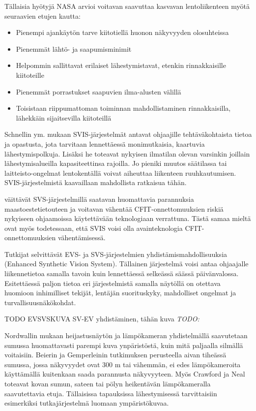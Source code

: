 \documentclass[utf8,bachelor,manualbib]{gradu3}
\begin{document}
Tällaisia hyötyjä NASA \citeyearpar{williamsym2001} arvioi voitavan saavuttaa kasvavan lentoliikenteen myötä seuraavien etujen kautta:

\begin{itemize}
\item Pienempi ajankäytön tarve kiitotiellä huonon näkyvyyden olosuhteissa
\item Pienemmät lähtö- ja saapumisminimit
\item Helpommin sallittavat erilaiset lähestymistavat, etenkin rinnakkaisille kiitoteille
\item Pienemmät porrastukset saapuvien ilma-alusten välillä
\item Toisistaan riippumattoman toiminnan mahdollistaminen rinnakkaisilla, lähekkäin sijaitsevilla kiitoteillä
\end{itemize} 

Schnellin ym. \citeyearpar{schnellym2004} mukaan SVIS-järjestelmät antavat ohjaajille tehtäväkohtaista tietoa ja opastusta, jota tarvitaan lennettäessä monimutkaisia, kaartuvia lähestymispolkuja. Lisäksi he toteavat nykyisen ilmatilan olevan varsinkin joillain lähestymisalueilla kapasiteettinsa rajoilla. Jo pieniki muutos säätilassa tai laitteisto-ongelmat lentokentällä voivat aiheuttaa liikenteen ruuhkautumisen. SVIS-järjestelmistä kaavaillaan mahdollista ratkaisua tähän.

\cite{baileyym2007} väittävät SVS-järjestelmillä saatavan huomattavia parannuksia maastoestetietouteen ja voitavan vähentää CFIT-onnettomuuksien riskiä nykyiseen ohjaamoissa käytettävään teknologiaan verrattuna. Tästä samaa mieltä ovat myös \cite{schnellym2004} todetessaan, että SVIS voisi olla avainteknologia CFIT-onnettomuuksien vähentämisessä.

Tutkijat selvittävät EVS- ja SVS-järjestelmien yhdistämismahdollisuuksia (Enhanced Synthetic Vision System). Tällainen järjestelmä voisi antaa ohjaajalle liikennetietoa samalla tavoin kuin lennettäessä selkeässä säässä päivänvalossa. Esitettäessä paljon tietoa eri järjestelmistä samalla näytöllä on otettava huomioon inhimilliset tekijät, lentäjän suorituskyky, mahdolliset ongelmat ja turvallisuusnäkökohdat. \citep{crawfordneal2006}

TODO EVSVSKUVA SV-EV yhdistäminen, tähän kuva \citep{mollersachs1994} \emph{TODO:}

Nordwallin \citeyearpar{nordwall1993} mukaan heijastusnäytön ja lämpökameran yhdistelmällä saavutetaan sumussa huomattavasti parempi kuva ynpäristöstä, kuin mitä paljaalla silmällä voitaisiin. Beierin ja Gemperleinin \citeyearpar{beiergemperlein2004} tutkimuksen perusteella aivan tiheässä sumussa, jossa näkyvyydet ovat 300 m tai vähemmän, ei edes lämpökameroita käyttämällä kuitenkaan saada parannusta näkyvyyteen. Myös Crawford ja Neal \citeyearpar{crawfordneal2006} toteavat kovan sumun, sateen tai pölyn heikentävän lämpökameralla saavutettavia etuja. Tällaisissa tapauksissa lähestymisessä tarvittaisiin esimerkiksi tutkajärjestelmä luomaan ympäristökuvaa.
\end{document}
